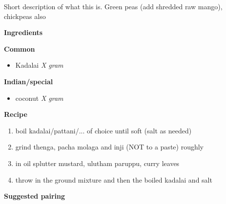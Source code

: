 Short description of what this is. Green peas (add shredded raw mango), chickpeas also

\large{\textbf{Ingredients}}
\begin{multicols}{2}
  \large{\textbf{Common}}
  \begin{itemize}
    \item Kadalai \hfill \textit{X gram}
  \end{itemize}
  \columnbreak
  \large{\textbf{Indian/special}}
  \begin{itemize}
    \item coconut \hfill \textit{X gram}
  \end{itemize}
\end{multicols}

\large{\textbf{Recipe}}

\begin{enumerate}
  \item boil kadalai/pattani/... of choice until soft (salt as needed)
  \item grind thenga, pacha molaga and inji (NOT to a paste) roughly
  \item in oil splutter mustard, ulutham paruppu, curry leaves
  \item throw in the ground mixture and then the boiled kadalai and salt
\end{enumerate}

\large{\textbf{Suggested pairing}}

